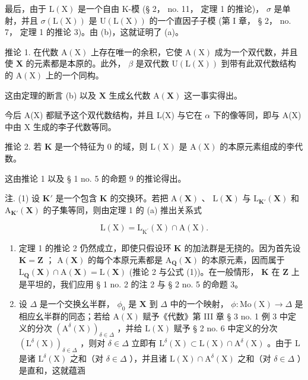 最后，由于 \(\mathrm{L}(\mathrm{X})\) 是一个自由 K-模 (§ 2， no. 11， 定理 1 的推论)， \(\sigma\) 是单射，并且 \(\sigma(\mathrm{L}(\mathrm{X}))\) 是 \(\mathrm{U}(\mathrm{L}(\mathrm{X}))\) 的一个直因子子模 (第 I 章， § 2， no. 7， 定理 1 的推论 3)。由 (b)，这就证明了 (a)。

推论 1. 在代数 \(\mathrm{A}(\mathrm{X})\) 上存在唯一的余积，它使 \(\mathrm{A}(\mathrm{X})\) 成为一个双代数，并且使 \(\mathbf{X}\) 的元素都是本原的。此外， \(\beta\) 是双代数 \(\mathrm{U}(\mathrm{L}(\mathrm{X}))\) 到带有此双代数结构的 \(\mathrm{A}(\mathrm{X})\) 上的一个同构。

这由定理的断言 (b) 以及 \(\mathbf{X}\) 生成幺代数 \(\mathrm{A}(\mathbf{X})\) 这一事实得出。

今后 A(X) 都赋予这个双代数结构，并且 L(X) 与它在 \(\alpha\) 下的像等同，即与 A(X) 中由 X 生成的李子代数等同。

推论 2. 若 \(\mathbf{K}\) 是一个特征为 0 的域，则 \(\mathrm{L}(\mathrm{X})\) 是 \(\mathrm{A}(\mathrm{X})\) 的本原元素组成的李代数。

这由推论 1 以及 § 1 no. 5 的命题 9 的推论得出。

注. (1) 设 \(\mathbf{K}'\) 是一个包含 \(\mathbf{K}\) 的交换环。若把 \(\mathrm{A}(\mathbf{X})\) 、 \(\mathrm{L}(\mathbf{X})\) 与 \(\mathrm{L}_{\mathbf{K}'}(\mathbf{X})\) 和 \(\mathrm{A}_{\mathbf{K}'}(\mathbf{X})\) 的子集等同，则由定理 1 的 (a) 推出关系式

\[
\mathrm{L} (\mathrm{X}) = \mathrm{L} _ {\mathrm{K} ^ {\prime}} (\mathrm{X}) \cap \mathrm{A} (\mathrm{X}).\tag{1}
\]

\begin{enumerate}
\def\labelenumi{(\arabic{enumi})}
\setcounter{enumi}{1}
\item
  定理 1 的推论 2 仍然成立，即使只假设环 \(\mathbf{K}\) 的加法群是无挠的。因为首先设 \(\mathbf{K} = \mathbf{Z}\) ； \(\mathrm{A}(\mathbf{X})\) 的每个本原元素都是 \(\mathrm{A}_{\mathbf{Q}}(\mathbf{X})\) 的本原元素，因而属于 \(\mathrm{L}_{\mathbf{Q}}(\mathbf{X}) \cap \mathrm{A}(\mathbf{X}) = \mathrm{L}(\mathbf{X})\) (推论 2 与公式 (1))。在一般情形， \(\mathbf{K}\) 在 \(\mathbf{Z}\) 上是平坦的，我们应用 § 1 no. 2 的注 2 与 § 2 no. 5 的命题 3。
\item
  设 \(\Delta\) 是一个交换幺半群， \(\phi_0\) 是 \(\mathbf{X}\) 到 \(\Delta\) 中的一个映射， \(\phi \colon \mathrm{Mo}(\mathrm{X})\to \Delta\) 是相应幺半群的同态；若给 \(\mathrm{A}(\mathrm{X})\) 赋予《代数》第 III 章 § 3 no. 1 例 3 中定义的分次 \((\mathrm{A}^{\delta}(\mathrm{X}))_{\delta \in \Delta}\) ，并给 \(\mathrm{L}(\mathrm{X})\) 赋予 § 2 no. 6 中定义的分次 \((\mathrm{L}^{\delta}(\mathrm{X}))_{\delta \in \Delta}\) ，则对 \(\delta \in \Delta\) 立即有 \(\mathrm{L}^{\delta}(\mathrm{X})\subset \mathrm{L}(\mathrm{X})\cap \mathrm{A}^{\delta}(\mathrm{X})\) 。由于 \(\mathrm{L}\) 是诸 \(\mathrm{L}^{\delta}(\mathrm{X})\) 之和（对 \(\delta \in \Delta\) ），并且诸 \(\mathrm{L}(\mathrm{X})\cap \mathrm{A}^{\delta}(\mathrm{X})\) 之和（对 \(\delta \in \Delta\) ）是直和，这就蕴涵
\end{enumerate}


